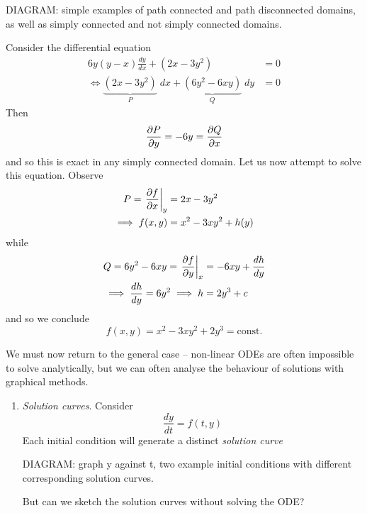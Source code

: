 \documentclass{../template/note}
\begin{document}
    DIAGRAM: simple examples of path connected and path disconnected domains, as well as simply connected and not simply connected domains.
    
    \begin{example}
        Consider the differential equation
        \begin{align*}
            6y(y-x) \frac{dy}{dx} + (2x-3y^2) &= 0 \\
            \iff \underbrace{(2x-3y^2)}_{P} \; dx + \underbrace{(6y^2 - 6xy)}_{Q} \; dy &= 0
        \end{align*}
        Then
        \[
            \pd{P}{y} = -6y = \pd{Q}{x}
        \]
        and so this is exact in any simply connected domain. Let us now attempt to solve this equation. Observe
        \begin{align*}
            P = \pd[y]{f}{x} &= 2x - 3y^2 \\
            \implies f(x,y) &= x^2 - 3xy^2 + h(y)
        \end{align*}
        while
        \begin{align*}
            Q = 6y^2 - 6xy = \pd[x]{f}{y} &= -6xy + \frac{dh}{dy} \\
            \implies \frac{dh}{dy} = 6y^2 \implies h &= 2y^3 + c
        \end{align*}
        and so we conclude
        \[
            f(x, y) = x^2 - 3xy^2 + 2y^3 = \text{const.}
        \]        
    \end{example}
    
    We must now return to the general case -- non-linear ODEs are often impossible to solve analytically, but we can often analyse the behaviour of solutions with graphical methods.

    \begin{enumerate}
        \item \emph{Solution curves}. Consider
        \[
            \frac{dy}{dt} = f(t, y)
        \]
        Each initial condition will generate a distinct \emph{solution curve}

        DIAGRAM: graph y against t, two example initial conditions with different corresponding solution curves.

        But can we sketch the solution curves without solving the ODE?
    \end{enumerate}
    
\end{document}
